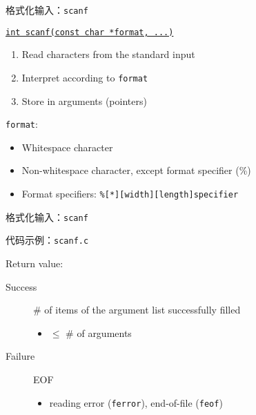 \begin{frame}{格式化输入：\texttt{scanf}}
  \centerline{\href{http://www.cplusplus.com/reference/cstdio/scanf/}
  {\texttt{int scanf(const char *format, ...)}}}

  \vspace{0.30cm}
  \begin{enumerate}
    \item Read characters from the standard input
    \item Interpret according to \texttt{format}
    \item Store in arguments (pointers)
  \end{enumerate}

  \vspace{0.30cm}
  \pause
  \texttt{format}:
  \begin{itemize}
    \item Whitespace character
    \item Non-whitespace character, except format specifier (\%)
    \item Format specifiers: \texttt{\%[*][width][length]specifier}
  \end{itemize}
\end{frame}

\begin{frame}{格式化输入：\texttt{scanf}}
  \centerline{代码示例：\texttt{scanf.c}}

  \vspace{0.60cm}
  Return value:
  \begin{description}
    \item[Success] \# of items of the argument list successfully filled
      \begin{itemize}
	\item $\le$ \# of arguments
      \end{itemize}
    \item[Failure] EOF
      \begin{itemize}
	\item reading error (\texttt{ferror}), end-of-file (\texttt{feof})
      \end{itemize}
  \end{description}
\end{frame}

